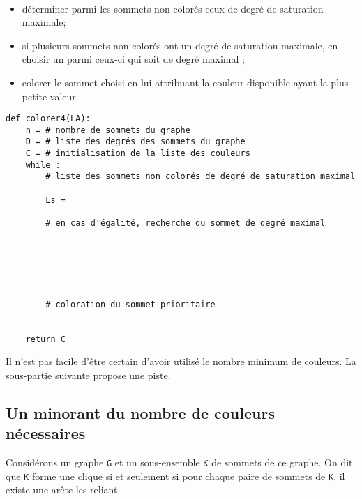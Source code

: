 \ifprof
\begin{corrige}~\\ \vspace{-.5cm}

\end{corrige}
\else
\fi


\begin{itemize}
\item déterminer parmi les sommets non colorés ceux de degré de saturation maximale;
\item si plusieurs sommets non colorés ont un degré de saturation maximale, en choisir un parmi ceux-ci qui soit de degré maximal ;
\item colorer le sommet choisi en lui attribuant la couleur disponible ayant la plus petite valeur.
\end{itemize}
\ifprof
\begin{corrige}

\end{corrige}
\else
\fi

\begin{lstlisting}
def colorer4(LA):
    n = # nombre de sommets du graphe
    D = # liste des degrés des sommets du graphe
    C = # initialisation de la liste des couleurs
    while :
        # liste des sommets non colorés de degré de saturation maximal

        Ls =

        # en cas d'égalité, recherche du sommet de degré maximal
        





        # coloration du sommet prioritaire
    
    
    return C
\end{lstlisting}

Il n'est pas facile d'être certain d'avoir utilisé le nombre minimum de couleurs. La sous-partie suivante propose une piste.


\subsection{Un minorant du nombre de couleurs nécessaires}
Considérons un graphe \lstinline{G} et un sous-ensemble \lstinline{K} de sommets de ce graphe. On dit que \lstinline{K} forme une clique si et seulement si pour chaque paire de sommets de \lstinline{K}, il existe une arête les reliant.

